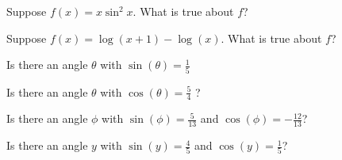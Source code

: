 \documentclass{ximera}
\begin{document}
\begin{problem}
  Suppose $f(x) = x \sin^2 x$.  What is true about $f$?
  \begin{multipleChoice}
  \end{multipleChoice}
\end{problem}

\begin{problem}
	Suppose $f(x) = \log(x+1) - \log(x)$.  What is true about $f$?
	\begin{multipleChoice}
  \end{multipleChoice}
\end{problem}

\begin{problem}
	Is there an angle $\theta$ with $\sin(\theta) = \frac{1}{5}$ %
	\begin{multipleChoice}
	\end{multipleChoice}
\end{problem}

\begin{problem}
	Is there an angle $\theta$ with $\cos(\theta) = \frac{5}{4}$ ?
	\begin{multipleChoice}
		\choice{Yes}
		\choice[correct]{No}
	\end{multipleChoice}
\end{problem}

\begin{problem}
	Is there an angle $\phi$ with $\sin(\phi) = \frac{5}{13}$ and $\cos(\phi) = -\frac{12}{13}$?
	\begin{multipleChoice}
		\choice[correct]{Yes}
		\choice{No}
	\end{multipleChoice}
\end{problem}

\begin{problem}
	Is there an angle $y$ with $\sin(y) = \frac{4}{5}$ and $\cos(y) = \frac{1}{5}$?
	\begin{multipleChoice}
	\end{multipleChoice}
\end{problem}
\end{document}
